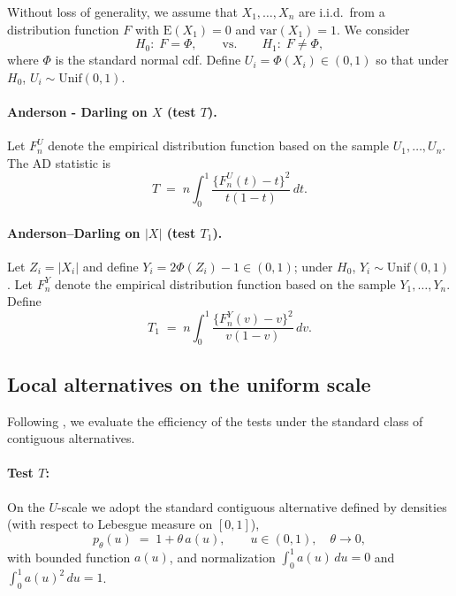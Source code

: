 \documentclass[12pt]{article}
\theoremstyle{remark}
\theoremstyle{plain}
\newtheorem{assumption}{Assumption}
\begin{document}
Without loss of generality, we assume that  $X_1,\dots,X_n$ are i.i.d.\ from a distribution function $F$ with $\mathrm{E}\left(X_1\right)=0$ and $\mathrm{var}\left(X_1\right)=1$. We consider
\[
H_0:\;F=\Phi, \qquad\text{vs.}\qquad H_1:\;F\neq \Phi,
\]
where $\Phi$ is the standard normal cdf. Define $U_i=\Phi(X_i)\in(0,1)$ so that under $H_0$, $U_i\sim\mathrm{Unif}(0,1)$.

\paragraph{Anderson - Darling on $X$ (test $T$).}
Let $F_n^{U}$ denote  the empirical distribution function based on the sample $U_1,\ldots,U_n$. The AD statistic is
\[
T \;=\; n\int_0^1 \frac{\{F_n^{U}(t)-t\}^2}{t(1-t)}\,dt.
\]

\paragraph{Anderson--Darling on $|X|$ (test $T_1$).}
Let $Z_i=|X_i|$ and define $Y_i = 2\Phi(Z_i)-1\in(0,1)$; under $H_0$, $Y_i\sim\mathrm{Unif}(0,1)$. 
Let  $F_n^{Y}$ denote  the empirical distribution function based on the sample $Y_1,\ldots,Y_n$.
Define
\[
T_1 \;=\; n\int_0^1 \frac{\{F_n^{Y}(v)-v\}^2}{v(1-v)}\,dv.
\]


\subsection{Local alternatives on the uniform scale}
\label{ssec:alts}
Following \citet{inglot2000vanishing}, we evaluate the efficiency of the tests under the standard class of contiguous alternatives.
\paragraph{Test $T$:} On the $U$-scale we adopt the standard contiguous alternative defined
by densities (with respect to Lebesgue measure on $[0,1]$),
\[
p_\theta(u)\;=\;1+\theta\,a(u), \qquad u\in(0,1),\quad \theta\to 0,
\]
with bounded function $a(u)$, and normalization $\int_0^1 a(u)\,du=0$ and $\int_0^1 a(u)^2\,du=1$.

%
\end{document}

